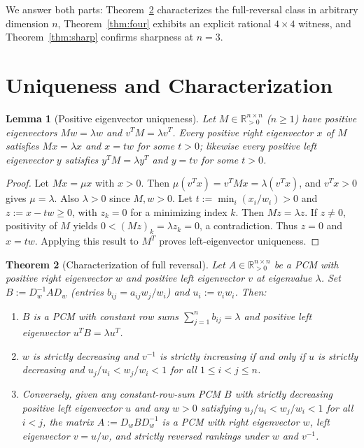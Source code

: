 \documentclass[11pt]{article}
\newtheorem{theorem}{Theorem}
\newtheorem{lemma}[theorem]{Lemma}
\begin{document}
We answer both parts: Theorem~\ref{thm:class} characterizes the full-reversal
class in arbitrary dimension $n$, Theorem~\ref{thm:four} exhibits an explicit
rational $4 \times 4$ witness, and Theorem~\ref{thm:sharp} confirms sharpness
at $n = 3$.

\section{Uniqueness and Characterization}

\begin{lemma}[Positive eigenvector uniqueness]\label{lem:uniq}
Let $M \in \mathbb{R}_{>0}^{n \times n}$ ($n \ge 1$) have positive eigenvectors
$M w = \lambda w$ and $v^T M = \lambda v^T$. Every positive right eigenvector
$x$ of $M$ satisfies $M x = \lambda x$ and $x = t w$ for some $t > 0$;
likewise every positive left eigenvector $y$ satisfies $y^T M = \lambda y^T$
and $y = t v$ for some $t > 0$.
\end{lemma}

\begin{proof}
Let $M x = \mu x$ with $x > 0$. Then
$\mu (v^T x) = v^T M x = \lambda (v^T x)$, and $v^T x > 0$ gives $\mu = \lambda$.
Also $\lambda > 0$ since $M, w > 0$. Let $t := \min_i (x_i / w_i) > 0$ and
$z := x - t w \ge 0$, with $z_k = 0$ for a minimizing index $k$. Then
$M z = \lambda z$. If $z \ne 0$, positivity of $M$ yields
$0 < (M z)_k = \lambda z_k = 0$, a contradiction. Thus $z = 0$ and $x = t w$.
Applying this result to $M^T$ proves left-eigenvector uniqueness.
\end{proof}

\begin{theorem}[Characterization of full reversal]\label{thm:class}
Let $A \in \mathbb{R}_{>0}^{n \times n}$ be a PCM with positive right
eigenvector $w$ and positive left eigenvector $v$ at eigenvalue $\lambda$. Set
$B := D_w^{-1} A D_w$ (entries $b_{ij} = a_{ij} w_j / w_i$) and
$u_i := v_i w_i$. Then:
\begin{enumerate}
\item $B$ is a PCM with constant row sums $\sum_{j=1}^n b_{ij} = \lambda$ and
positive left eigenvector $u^T B = \lambda u^T$.
\item $w$ is strictly decreasing and $v^{-1}$ is strictly increasing if and
only if $u$ is strictly decreasing and
$u_j / u_i < w_j / w_i < 1$ for all $1 \le i < j \le n$.
\item Conversely, given any constant-row-sum PCM $B$ with strictly decreasing
positive left eigenvector $u$ and any $w > 0$ satisfying
$u_j / u_i < w_j / w_i < 1$ for all $i < j$, the matrix
$A := D_w B D_w^{-1}$ is a PCM with right eigenvector $w$, left eigenvector
$v = u / w$, and strictly reversed rankings under $w$ and $v^{-1}$.
\end{enumerate}
\end{theorem}
\end{document}
